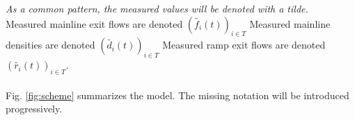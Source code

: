 \emph{As a common pattern, the measured values will be denoted with a tilde.}\\
Measured mainline exit flows are denoted $(\widetilde{f_{i}}(t))_{i\in{T}}$
Measured mainline densities are denoted $(\widetilde{d_{i}}(t))_{i\in{T}}$
Measured ramp exit flows are denoted $(\widetilde{r_{i}}(t))_{i\in{T}}$.\\
\\
Fig.	 \ref{fig:scheme} summarizes the model. The missing notation will be introduced progressively. \\


